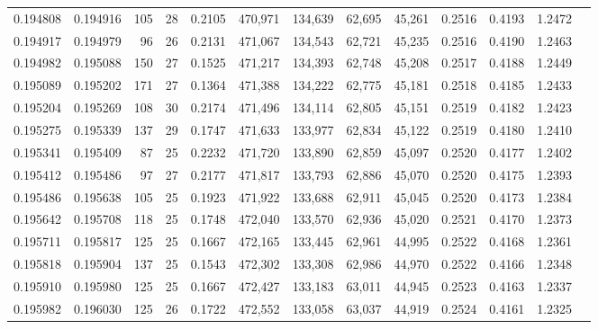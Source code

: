 \begin{tabular}{rrrrrrrrrrrrr}
0.194808 & 0.194916 & 105 &  28 &                                     0.2105 & 470,971 & 134,639 &  62,695 &  45,261 & 0.2516 & 0.4193 & 1.2472 \\
0.194917 & 0.194979 &  96 &  26 &                                     0.2131 & 471,067 & 134,543 &  62,721 &  45,235 & 0.2516 & 0.4190 & 1.2463 \\
0.194982 & 0.195088 & 150 &  27 &                                     0.1525 & 471,217 & 134,393 &  62,748 &  45,208 & 0.2517 & 0.4188 & 1.2449 \\
0.195089 & 0.195202 & 171 &  27 &                                     0.1364 & 471,388 & 134,222 &  62,775 &  45,181 & 0.2518 & 0.4185 & 1.2433 \\
0.195204 & 0.195269 & 108 &  30 &                                     0.2174 & 471,496 & 134,114 &  62,805 &  45,151 & 0.2519 & 0.4182 & 1.2423 \\
0.195275 & 0.195339 & 137 &  29 &                                     0.1747 & 471,633 & 133,977 &  62,834 &  45,122 & 0.2519 & 0.4180 & 1.2410 \\
0.195341 & 0.195409 &  87 &  25 &                                     0.2232 & 471,720 & 133,890 &  62,859 &  45,097 & 0.2520 & 0.4177 & 1.2402 \\
0.195412 & 0.195486 &  97 &  27 &                                     0.2177 & 471,817 & 133,793 &  62,886 &  45,070 & 0.2520 & 0.4175 & 1.2393 \\
0.195486 & 0.195638 & 105 &  25 &                                     0.1923 & 471,922 & 133,688 &  62,911 &  45,045 & 0.2520 & 0.4173 & 1.2384 \\
0.195642 & 0.195708 & 118 &  25 &                                     0.1748 & 472,040 & 133,570 &  62,936 &  45,020 & 0.2521 & 0.4170 & 1.2373 \\
0.195711 & 0.195817 & 125 &  25 &                                     0.1667 & 472,165 & 133,445 &  62,961 &  44,995 & 0.2522 & 0.4168 & 1.2361 \\
0.195818 & 0.195904 & 137 &  25 &                                     0.1543 & 472,302 & 133,308 &  62,986 &  44,970 & 0.2522 & 0.4166 & 1.2348 \\
0.195910 & 0.195980 & 125 &  25 &                                     0.1667 & 472,427 & 133,183 &  63,011 &  44,945 & 0.2523 & 0.4163 & 1.2337 \\
0.195982 & 0.196030 & 125 &  26 &                                     0.1722 & 472,552 & 133,058 &  63,037 &  44,919 & 0.2524 & 0.4161 & 1.2325 \\

\end{tabular}
